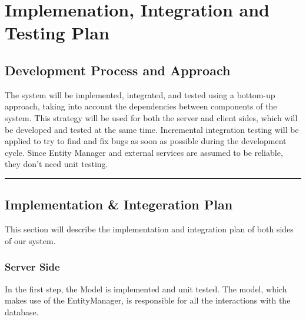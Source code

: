 \documentclass{Configuration_Files/Template}
\begin{document}
\chapter{Implemenation, Integration and Testing Plan}

\section{Development Process and Approach}

The system will be implemented, integrated, and tested using a bottom-up approach, taking into account the dependencies between components of the system. This strategy will be used for both the server and client sides, which will be developed and tested at the same time. Incremental integration testing will be applied to try to find and fix bugs as soon as possible during the development cycle. Since Entity Manager and external services are assumed to be reliable, they don't need unit testing.

{\color{bluepoli}\rule{\linewidth}{0.1pt}}

\section{Implementation \& Integeration Plan}

This section will describe the implementation and integration plan of both sides of our system.

\subsection{Server Side}

In the first step, the Model is implemented and unit tested. The model, which makes use of the EntityManager, is responsible for all the interactions with the database.
\end{document}
